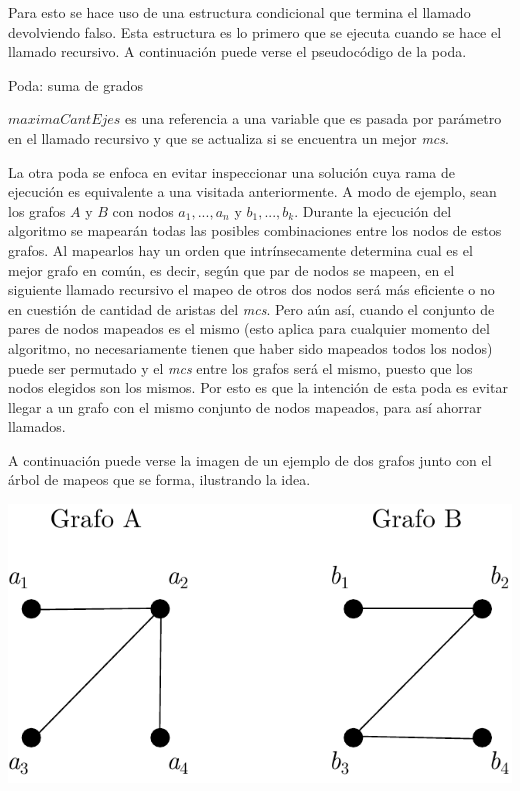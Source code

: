 Para esto se hace uso de una estructura condicional que termina el llamado
devolviendo falso. Esta estructura es lo primero que se ejecuta cuando se hace
el llamado recursivo. A continuación puede verse el pseudocódigo de la poda.

\begin{algorithm}
    \SetAlgoVlined
    \caption{Poda: suma de grados}
     {
    }
\end{algorithm}

$maximaCantEjes$ es una referencia a una variable que es pasada por parámetro
en el llamado recursivo y que se actualiza si se encuentra un mejor
\textit{mcs}.

La otra poda se enfoca en evitar inspeccionar una solución cuya rama de
ejecución es equivalente a una visitada anteriormente. A modo de ejemplo, sean
los grafos $A$ y $B$ con nodos $a_1, ..., a_n$ y $b_1, ..., b_k$. Durante la
ejecución del algoritmo se mapearán todas las posibles combinaciones entre
los nodos de estos grafos. Al mapearlos hay un orden que intrínsecamente
determina cual es el mejor grafo en común, es decir, según que par de nodos
se mapeen, en el siguiente llamado recursivo el mapeo de otros dos nodos
será más eficiente o no en cuestión de cantidad de aristas del \textit{mcs}.
Pero aún así, cuando el conjunto de pares de nodos mapeados es el mismo (esto
aplica para cualquier momento del algoritmo, no necesariamente tienen que
haber sido mapeados todos los nodos) puede ser permutado y el \textit{mcs}
entre los grafos será el mismo, puesto que los nodos elegidos son los mismos.
Por esto es que la intención de esta poda es evitar llegar a un grafo con el
mismo conjunto de nodos mapeados, para así ahorrar llamados.

A continuación puede verse la imagen de un ejemplo de dos grafos junto con el
árbol de mapeos que se forma, ilustrando la idea.

\begin{center}
\includegraphics[width=.45\textwidth]{imagenes/ex2_grafos.pdf}
\end{center}

